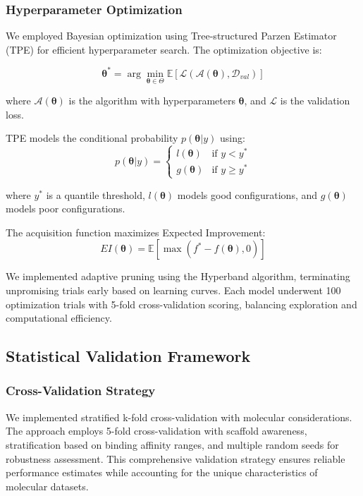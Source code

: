 \documentclass[preprint, 10pt]{elsarticle}
\begin{document}
\subsubsection{Hyperparameter Optimization}
We employed Bayesian optimization using Tree-structured Parzen Estimator (TPE) \cite{akiba2019optuna} for efficient hyperparameter search. The optimization objective is:

$$\boldsymbol{\theta}^* = \arg\min_{\boldsymbol{\theta} \in \Theta} \mathbb{E}[\mathcal{L}(\mathcal{A}(\boldsymbol{\theta}), \mathcal{D}_{val})]$$

where $\mathcal{A}(\boldsymbol{\theta})$ is the algorithm with hyperparameters $\boldsymbol{\theta}$, and $\mathcal{L}$ is the validation loss.

TPE models the conditional probability $p(\boldsymbol{\theta}|y)$ using:
$$p(\boldsymbol{\theta}|y) = \begin{cases}
l(\boldsymbol{\theta}) & \text{if } y < y^* \\
g(\boldsymbol{\theta}) & \text{if } y \geq y^*
\end{cases}$$

where $y^*$ is a quantile threshold, $l(\boldsymbol{\theta})$ models good configurations, and $g(\boldsymbol{\theta})$ models poor configurations.

The acquisition function maximizes Expected Improvement:
$$EI(\boldsymbol{\theta}) = \mathbb{E}[\max(f^* - f(\boldsymbol{\theta}), 0)]$$

We implemented adaptive pruning using the Hyperband algorithm, terminating unpromising trials early based on learning curves. Each model underwent 100 optimization trials with 5-fold cross-validation scoring, balancing exploration and computational efficiency.

\subsection{Statistical Validation Framework}

\subsubsection{Cross-Validation Strategy}
We implemented stratified k-fold cross-validation with molecular considerations. The approach employs 5-fold cross-validation with scaffold awareness, stratification based on binding affinity ranges, and multiple random seeds for robustness assessment. This comprehensive validation strategy ensures reliable performance estimates while accounting for the unique characteristics of molecular datasets.
\end{document}
